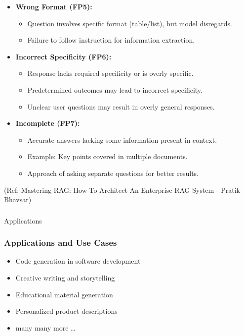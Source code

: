 \begin{frame}[fragile]
\begin{itemize}
  \item \textbf{Wrong Format (FP5):}
    \begin{itemize}
        \item Question involves specific format (table/list), but model disregards.
        \item Failure to follow instruction for information extraction.
    \end{itemize}
  
  \item \textbf{Incorrect Specificity (FP6):}
    \begin{itemize}
        \item Response lacks required specificity or is overly specific.
        \item Predetermined outcomes may lead to incorrect specificity.
        \item Unclear user questions may result in overly general responses.
    \end{itemize}
  
  \item \textbf{Incomplete (FP7):}
    \begin{itemize}
        \item Accurate answers lacking some information present in context.
        \item Example: Key points covered in multiple documents.
        \item Approach of asking separate questions for better results.
    \end{itemize}
\end{itemize}

{\tiny (Ref: Mastering RAG: How To Architect An Enterprise RAG System - Pratik Bhavsar)}

\end{frame}

\begin{frame}[fragile]\frametitle{}
\begin{center}
{\Large Applications}
\end{center}
\end{frame}


\begin{frame}[fragile]\frametitle{Applications and Use Cases}

\begin{itemize}
\item Code generation in software development
\item Creative writing and storytelling
\item Educational material generation
\item Personalized product descriptions
\item many many more \ldots
\end{itemize}	

\end{frame}


